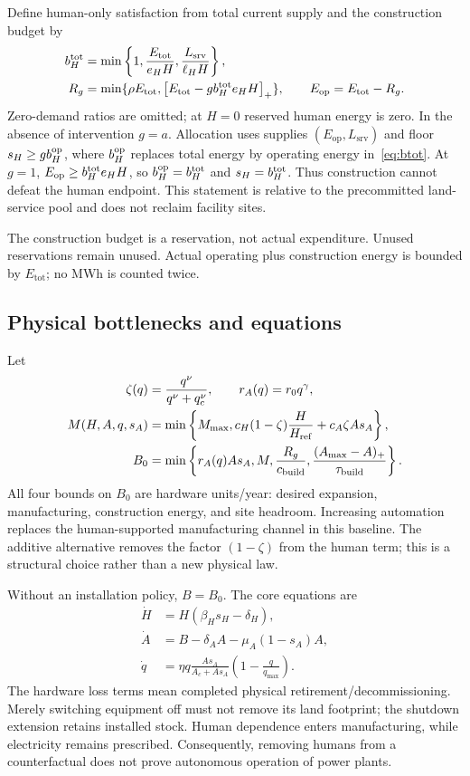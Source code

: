 \documentclass[12pt,a4paper]{article}
\theoremstyle{remark}
\newcommand{\pos}[1]{\left[#1\right]_+}
\newcommand{\Etotal}{E_{\mathrm{tot}}}
\newcommand{\Eop}{E_{\mathrm{op}}}
\newcommand{\Lservice}{L_{\mathrm{srv}}}
\begin{document}
Define human-only satisfaction from total current supply and the construction budget by
\begin{align}
b_H^{\rm tot}&=\min\left\{1,\frac{\Etotal}{e_HH},\frac{\Lservice}{\ell_HH}\right\},\label{eq:btot}\\
R_g&=\min\{\rho\Etotal,\pos{\Etotal-gb_H^{\rm tot}e_HH}\},\qquad
\Eop=\Etotal-R_g.\label{eq:budget}
\end{align}
Zero-demand ratios are omitted; at $H=0$ reserved human energy is zero. In the absence of intervention $g=a$. Allocation uses supplies $(\Eop,\Lservice)$ and floor $s_H\ge gb_H^{\rm op}$, where $b_H^{\rm op}$ replaces total energy by operating energy in~\eqref{eq:btot}. At $g=1$, $\Eop\ge b_H^{\rm tot}e_HH$, so $b_H^{\rm op}=b_H^{\rm tot}$ and $s_H=b_H^{\rm tot}$. Thus construction cannot defeat the human endpoint. This statement is relative to the precommitted land-service pool and does not reclaim facility sites.

The construction budget is a reservation, not actual expenditure. Unused reservations remain unused. Actual operating plus construction energy is bounded by $\Etotal$; no MWh is counted twice.

\subsection{Physical bottlenecks and equations}
Let
\begin{align}
\zeta(q)&=\frac{q^\nu}{q^\nu+q_c^\nu},\qquad r_A(q)=r_0q^\gamma,\\
M(H,A,q,s_A)&=\min\left\{M_{\max},c_H(1-\zeta)\frac{H}{H_{\rm ref}}+c_A\zeta As_A\right\},\\
B_0&=\min\left\{r_A(q)As_A,M,\frac{R_g}{c_{\rm build}},
\frac{(A_{\max}-A)_+}{\tau_{\rm build}}\right\}.\label{eq:build}
\end{align}
All four bounds on $B_0$ are hardware units/year: desired expansion, manufacturing, construction energy, and site headroom. Increasing automation replaces the human-supported manufacturing channel in this baseline. The additive alternative removes the factor $(1-\zeta)$ from the human term; this is a structural choice rather than a new physical law.

Without an installation policy, $B=B_0$. The core equations are
\begin{align}
\dot H&=H(\beta_Hs_H-\delta_H),\label{eq:human}\\
\dot A&=B-\delta_AA-\mu_A(1-s_A)A,\label{eq:hardware}\\
\dot q&=\eta q\frac{As_A}{A_c+As_A}\left(1-\frac{q}{q_{\max}}\right).\label{eq:capability}
\end{align}
The hardware loss terms mean completed physical retirement/decommissioning. Merely switching equipment off must not remove its land footprint; the shutdown extension retains installed stock. Human dependence enters manufacturing, while electricity remains prescribed. Consequently, removing humans from a counterfactual does not prove autonomous operation of power plants.
\end{document}
